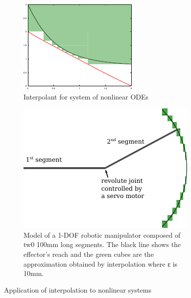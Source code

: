 \begin{figure}
\begin{subfigure}{0.45\textwidth}
  \centering
  \includegraphics[scale=1.5]{img/ode.pdf}
  \caption{ Interpolant for system of nonlinear ODEs } %
  \label{fig:ode}
\end{subfigure}
\hfill
\begin{subfigure}{0.5\textwidth}
  \centering
  \includegraphics[scale=1]{img/arm.pdf}
  \caption{
    Model of a 1-DOF robotic manipulator composed of tw0 100mm long segments.
    The black line shows the effector's reach and the green cubes are the approximation obtained by interpolation where ε is 10mm.
  }
  \label{fig:robot}
\end{subfigure}
\caption{Application of interpolation to nonlinear systems}
\end{figure}


